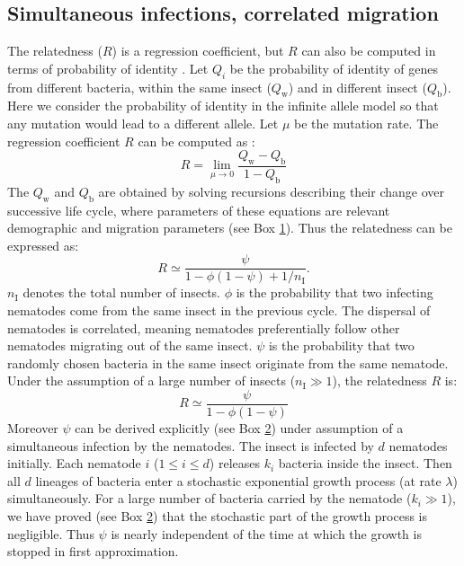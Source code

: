 \documentclass[10pt]{article}
\newcommand{\nI}{{n_\textrm{I}}}
\newcommand{\qw}{Q_\mathrm{w}}
\newcommand{\qb}{Q_\mathrm{b}}
\newcommand{\psis}{\psi}
\begin{document}
\begin{multicols}{2}
\subsection*{Simultaneous infections, correlated migration}
The relatedness ($R$) is a regression coefficient, but $R$ can also be computed in terms of probability of identity \cite{rousset2004genetic}.
Let $Q_i$ be the probability of identity of genes from different bacteria, within the same insect ($\qw$) and in different insect ($\qb$).
Here we consider the probability of identity in the infinite allele model so that any mutation would lead to a different allele.
Let $\mu$ be the mutation rate.
The regression coefficient $R$ can be computed as \cite{rousset2004genetic}:
  \begin{equation}
 R = \lim_{\mu \rightarrow 0}\dfrac{\qw - \qb }{ 1- \qb }
 \end{equation}
 The $\qw$ and $\qb$ are obtained by solving recursions describing their change over successive life cycle, where parameters of these equations are relevant demographic and migration parameters (see Box \hyperref[box:life_cycle_relatedness]{1}).
 Thus the relatedness can be expressed as:
  \begin{equation}
 R \simeq \dfrac{ \psis  }{ 1 - \phi (1- \psis )+1 / \nI }.  \label{R_psi_phi_nI}
 \end{equation}
$\nI$ denotes the total number of insects.
$\phi$ is the probability that two infecting nematodes come from the same insect in the previous cycle.
The dispersal of nematodes is correlated, meaning nematodes preferentially follow other nematodes migrating out of the same insect.
 $\psis$ is the probability that two randomly chosen bacteria in the same insect originate from the same nematode.
Under the assumption of a large number of insects ($\nI \gg 1$), the relatedness $R$ is:
 \begin{equation}
 R  \simeq \dfrac{ \psis  }{ 1 - \phi (1- \psis ) }
 \end{equation}
Moreover $\psis$ can be derived explicitly (see Box \hyperref[box:psi_simultaneous]{2}) under assumption of a simultaneous infection by the nematodes.
The insect is infected by $d$ nematodes initially.
Each nematode $i$ ($ 1 \leq i \leq d$) releases $k_i$ bacteria inside the insect.
Then all $d$ lineages of bacteria enter a stochastic exponential growth process (at rate $\lambda$) simultaneously.
For a large number of bacteria carried by the nematode ($k_i \gg 1$), we have proved (see Box \hyperref[box:psi_simultaneous]{2}) that the stochastic part of the growth process is negligible. Thus $\psis$ is nearly independent of the time at which the growth is stopped in first approximation.

\end{multicols}
\end{document}
